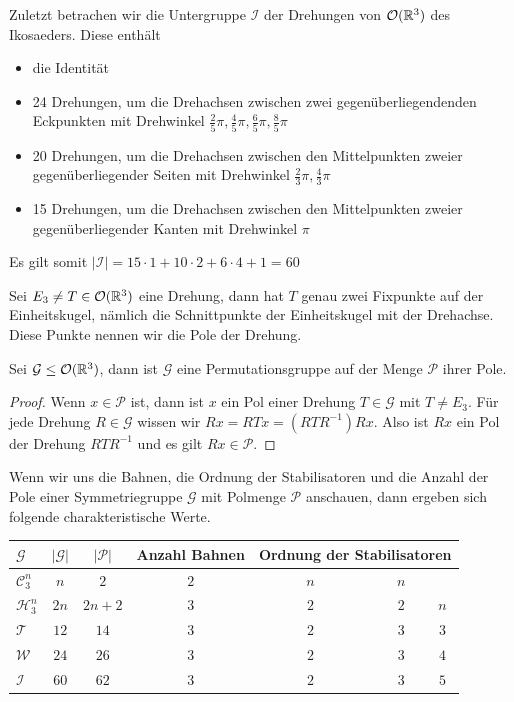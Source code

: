 Zuletzt betrachen wir die Untergruppe $\mathcal{I}$ der Drehungen von ${\mathcal{O}(\mathbb{R}^3)}$ des Ikosaeders. Diese enthält
\begin{itemize} 
  \item die Identität
  \item 24 Drehungen, um die Drehachsen zwischen zwei gegenüberliegendenden Eckpunkten mit Drehwinkel $\frac{2}{5}\pi,\frac{4}{5}\pi,\frac{6}{5}\pi,\frac{8}{5}\pi$
  \item 20 Drehungen, um die Drehachsen zwischen den Mittelpunkten zweier gegenüberliegender Seiten mit Drehwinkel $\frac{2}{3}\pi,\frac{4}{3}\pi$
  \item 15 Drehungen, um die Drehachsen zwischen den Mittelpunkten zweier gegenüberliegender Kanten mit Drehwinkel $\pi$
\end{itemize}
Es gilt somit $|\mathcal{I}|=15 \cdot 1 + 10 \cdot 2 + 6 \cdot 4 +1 = 60$
\begin{defi}
 Sei $E_3 \neq T \in {\mathcal{O}(\mathbb{R}^3)}$ eine Drehung, dann hat $T$ genau zwei Fixpunkte auf der Einheitskugel, nämlich die Schnittpunkte der Einheitskugel mit der Drehachse. Diese Punkte nennen wir die Pole der Drehung.
\end{defi}
\begin{lemma}
 Sei $\mathcal{G} \leq {\mathcal{O}(\mathbb{R}^3)}$, dann ist $\mathcal{G}$ eine Permutationsgruppe auf der Menge $\mathcal{P}$ ihrer Pole.
\end{lemma}
\begin{proof}
 Wenn $x \in \mathcal{P}$ ist, dann ist $x$ ein Pol einer Drehung $T \in \mathcal{G}$ mit $T \neq E_3$. Für jede Drehung $R \in \mathcal{G}$ wissen wir $Rx=RTx=(RTR^{-1})Rx$. Also ist $Rx$ ein Pol der Drehung $RTR^{-1}$ und es gilt $Rx \in \mathcal{P}$.
\end{proof}
\begin{bem}
 Wenn wir uns die Bahnen, die Ordnung der Stabilisatoren und die Anzahl der Pole einer Symmetriegruppe $\mathcal{G}$ mit Polmenge $\mathcal{P}$ anschauen, dann ergeben sich folgende charakteristische Werte.
 {%
\begin{center}
\begin{tabular}{l|cccccc}
$\mathcal{G}$ & $|\mathcal{G}|$ & $|\mathcal{P}|$ & Anzahl Bahnen & \multicolumn{3}{c}{Ordnung der Stabilisatoren}\\
\hline
$\mathcal{C}^n_3$ & $n$ & $2$ & $2$ & \ \ \ \ \ $n$ & \ \ \ \ \ \ $n$ & \\
$\mathcal{H}^n_3$ & $2n$ & $2n + 2$ & $3$ & \ \ \ \ \ $2$ & \ \ \ \ \ \ $2$ & $n$\\
$\mathcal{T}$ & $12$ & $14$ & $3$ & \ \ \ \ \ $2$ & \ \ \ \ \ \ $3$ & $3$\\
$\mathcal{W}$ & $24$ & $26$ & $3$ & \ \ \ \ \  $2$ & \ \ \ \ \ \ $3$ & $4$\\
$\mathcal{I}$ & $60$ & $62$ & $3$ & \ \ \ \ \ $2$ & \ \ \ \ \ \ $3$ & $5$
 \end{tabular}
 \end{center}
}%
\end{bem}
